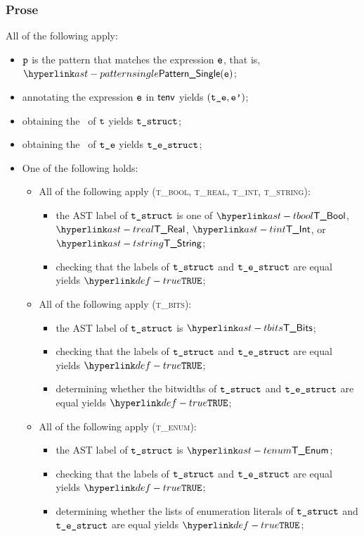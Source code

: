 \subsubsection{Prose}
All of the following apply:
\begin{itemize}
  \item $\texttt{p}$ is the pattern that matches the expression $\texttt{e}$, that is, $\PatternSingle(\ve)$;
  \item annotating the expression $\texttt{e}$ in $\textsf{tenv}$ yields $(\texttt{t\_e}, \texttt{e'})$\ProseOrTypeError;
  \item obtaining the \underlyingtype\ of $\texttt{t}$ yields $\texttt{t\_struct}$\ProseOrTypeError;
  \item obtaining the \underlyingtype\ of $\texttt{t\_e}$ yields $\texttt{t\_e\_struct}$\ProseOrTypeError;
  \item One of the following holds:
  \begin{itemize}
    \item All of the following apply (\textsc{t\_bool, t\_real, t\_int, t\_string}):
    \begin{itemize}
      \item the AST label of $\texttt{t\_struct}$ is one of $\TBool$, $\TReal$, $\TInt$, or $\TString$;
      \item checking that the labels of $\texttt{t\_struct}$ and $\texttt{t\_e\_struct}$ are equal yields $\True$\ProseOrTypeError;
    \end{itemize}

    \item All of the following apply (\textsc{t\_bits}):
    \begin{itemize}
      \item the AST label of $\texttt{t\_struct}$ is $\TBits$;
      \item checking that the labels of $\texttt{t\_struct}$ and $\texttt{t\_e\_struct}$ are equal yields $\True$\ProseOrTypeError;
      \item determining whether the bitwidths of $\texttt{t\_struct}$ and $\texttt{t\_e\_struct}$ are equal yields $\True$\ProseOrTypeError;
    \end{itemize}

    \item All of the following apply (\textsc{t\_enum}):
    \begin{itemize}
      \item the AST label of $\texttt{t\_struct}$ is $\TEnum$;
      \item checking that the labels of $\texttt{t\_struct}$ and $\texttt{t\_e\_struct}$ are equal yields $\True$\ProseOrTypeError;
      \item determining whether the lists of enumeration literals of $\texttt{t\_struct}$ and $\texttt{t\_e\_struct}$ are equal yields $\True$\ProseOrTypeError;
    \end{itemize}


\end{itemize}
\end{itemize}
